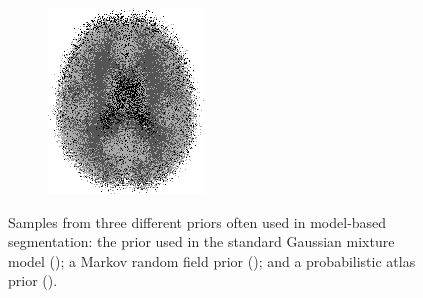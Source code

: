 \documentclass[10pt,twoside]{book}
\begin{document}
\begin{figure}
\begin{subfigure}{0.3\textwidth}
     \caption{}
     \label{fig:samplesFrommodelBasedSegmentationPriors_b}
  \end{subfigure}
  \hfill
  \begin{subfigure}{0.3\textwidth}
     \centering
     \includegraphics[width=\textwidth]{atlasSample}
     \caption{}
     \label{fig:samplesFrommodelBasedSegmentationPriors_c}
  \end{subfigure}
  \caption{Samples from three different priors often used in model-based segmentation: the prior used in the standard Gaussian mixture model ();
           a Markov random field prior (); and a probabilistic atlas prior ().}
  \label{fig:samplesFrommodelBasedSegmentationPriors}
\end{figure}
\end{document}
